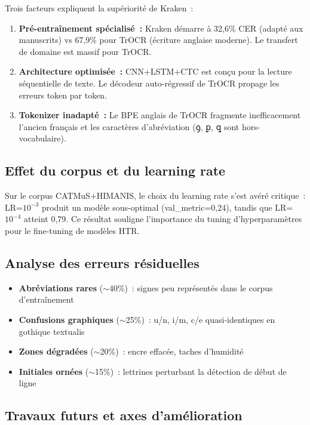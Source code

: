 \documentclass[11pt,a4paper]{article}
\begin{document}
Trois facteurs expliquent la supériorité de Kraken~:
\begin{enumerate}[leftmargin=*, itemsep=2pt]
\item \textbf{Pré-entraînement spécialisé~:} Kraken démarre à 32,6\% CER (adapté aux manuscrits) vs 67,9\% pour TrOCR (écriture anglaise moderne). Le transfert de domaine est massif pour TrOCR.
\item \textbf{Architecture optimisée~:} CNN+LSTM+CTC est conçu pour la lecture séquentielle de texte. Le décodeur auto-régressif de TrOCR propage les erreurs token par token.
\item \textbf{Tokenizer inadapté~:} Le BPE anglais de TrOCR fragmente inefficacement l'ancien français et les caractères d'abréviation (ꝯ, ꝑ, ꝗ sont hors-vocabulaire).
\end{enumerate}

\subsection{Effet du corpus et du learning rate}

Sur le corpus CATMuS+HIMANIS, le choix du learning rate s'est avéré critique~: LR=$10^{-3}$ produit un modèle sous-optimal (val\_metric=0,24), tandis que LR=$10^{-4}$ atteint 0,79. Ce résultat souligne l'importance du tuning d'hyperparamètres pour le fine-tuning de modèles HTR.

\subsection{Analyse des erreurs résiduelles}

\begin{itemize}[leftmargin=*, itemsep=2pt]
\item \textbf{Abréviations rares} ($\sim$40\%)~: signes peu représentés dans le corpus d'entraînement
\item \textbf{Confusions graphiques} ($\sim$25\%)~: u/n, i/m, c/e quasi-identiques en gothique textualis
\item \textbf{Zones dégradées} ($\sim$20\%)~: encre effacée, taches d'humidité
\item \textbf{Initiales ornées} ($\sim$15\%)~: lettrines perturbant la détection de début de ligne
\end{itemize}

\subsection{Travaux futurs et axes d'amélioration}
\end{document}
